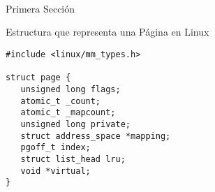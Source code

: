 \documentclass{article}
\title{                                             %
    \vspace{2in}
    \textmd{\textbf{\asignatura \\ \titulo}} \\         %
    \normalsize\vspace{0.1in}\small{\fecha}  \\         %
    \vspace{3in}
}
\author{\textbf{\autor}}                            %
\date{}                                             %
\begin{document}
\maketitle



\newpage
\tableofcontents
\newpage


\begin{section}{Primera Sección}
\lipsum[1]

\begin{listing}
\caption{Estructura que representa una Página en Linux}
\begin{verbatim}
#include <linux/mm_types.h>

struct page {
   unsigned long flags;
   atomic_t _count;
   atomic_t _mapcount;
   unsigned long private;
   struct address_space *mapping;
   pgoff_t index;
   struct list_head lru;
   void *virtual;
}
\end{verbatim}
\label{listing:page}
\end{listing}

\lipsum[2]

\end{section}
\end{document}
